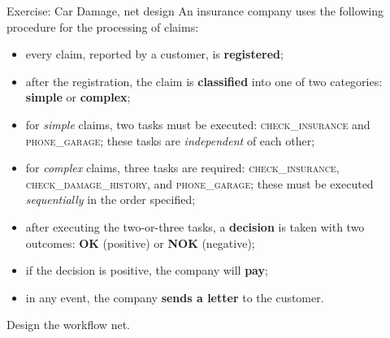 \begin{examplebox}{Exercise: Car Damage, net design}
An insurance company uses the following procedure for the processing of claims:

\begin{itemize}
  \item every claim, reported by a customer, is \textbf{registered};
  \item after the registration, the claim is \textbf{classified} into one of two categories: \textbf{simple} or \textbf{complex};
  \item for \emph{simple} claims, two tasks must be executed: \textsc{check\_insurance} and \textsc{phone\_garage}; these tasks are \emph{independent} of each other;
  \item for \emph{complex} claims, three tasks are required: \textsc{check\_insurance}, \textsc{check\_damage\_history}, and \textsc{phone\_garage}; these must be executed \emph{sequentially} in the order specified;
  \item after executing the two-or-three tasks, a \textbf{decision} is taken with two outcomes: \textbf{OK} (positive) or \textbf{NOK} (negative);
  \item if the decision is positive, the company will \textbf{pay};
  \item in any event, the company \textbf{sends a letter} to the customer.
\end{itemize}

Design the workflow net.
\end{examplebox}


